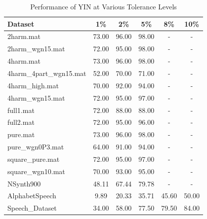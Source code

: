 \documentclass{ieeeaccess}
\begin{document}
\begin{table}[h!]
\centering
\begin{tabular}{lccccc}
\hline
\textbf{Dataset} & \textbf{1\%} & \textbf{2\%} & \textbf{5\%} & \textbf{8\%} & \textbf{10\%} \\ \hline
2harm.mat & 73.00 & 96.00 & 98.00 & - & - \\ 
2harm\_wgn15.mat & 72.00 & 95.00 & 98.00 & - & - \\ 
4harm.mat & 73.00 & 96.00 & 98.00 & - & - \\ 
4harm\_4part\_wgn15.mat & 52.00 & 70.00 & 71.00 & - & - \\ 
4harm\_high.mat & 70.00 & 92.00 & 94.00 & - & - \\ 
4harm\_wgn15.mat & 72.00 & 95.00 & 97.00 & - & - \\ 
full1.mat & 72.00 & 88.00 & 88.00 & - & - \\ 
full2.mat & 72.00 & 95.00 & 96.00 & - & - \\ 
pure.mat & 73.00 & 96.00 & 98.00 & - & - \\ 
pure\_wgn0P3.mat & 64.00 & 91.00 & 94.00 & - & - \\ 
square\_pure.mat & 72.00 & 95.00 & 97.00 & - & - \\ 
square\_wgn10.mat & 70.00 & 93.00 & 95.00 & - & - \\ 
NSynth900 & 48.11 & 67.44 & 79.78 & - & - \\ 
AlphabetSpeech & 9.89 & 20.33 & 35.71 & 45.60 & 50.00 \\ 
Speech\_Dataset & 34.00 & 58.00 & 77.50 & 79.50 & 84.00 \\ \hline
\end{tabular}
\caption{Performance of YIN at Various Tolerance Levels}
\label{tab:yin_performance}
\end{table}
\end{document}
